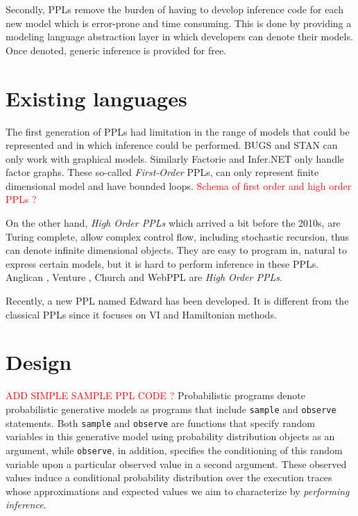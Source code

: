 Secondly, \gls{PPL}s remove the burden of having to develop inference code for each new model which is error-prone and time consuming.
This is done by providing a modeling language abstraction layer in which developers can denote their models.  Once denoted, generic inference is provided for free.

\section{Existing languages}
The first generation of \gls{PPL}s had limitation in the range of models that could be represented and in which inference could be performed.
BUGS \cite{Bugs} and STAN \cite{Stan} can only work with graphical models.
Similarly Factorie \cite{Factorie} and Infer.NET \cite{InferNET} only handle factor graphs.
These so-called \textit{First-Order} \gls{PPLs}, can only represent finite dimensional model and have bounded loops.
\textcolor{red}{Schema of first order and high order PPLs ?}

On the other hand, \textit{High Order \gls{PPLs}} which arrived a bit before the 2010s, are Turing complete, allow complex control flow, including stochastic recursion, thus can denote infinite dimensional objects.
They are easy to program in, natural to express certain models, but it is hard to perform inference in
these \gls{PPL}s. Anglican \cite{wood-aistats-2014}, Venture \cite{Mansinghka:2014ty}, Church \cite{Goodman:2012uq} and WebPPL \cite{dippl} are \textit{High Order \gls{PPLs}}.


Recently, a new \gls{PPL} named Edward \cite{Edward} has been developed. It is different from the classical \gls{PPL}s since it focuses on \gls{VI} and Hamiltonian methods.


\section{Design}
\textcolor{red}{ADD SIMPLE SAMPLE PPL CODE ?}
Probabilistic programs denote probabilistic generative models as programs that include \texttt{sample} and \texttt{observe} statements. Both \texttt{sample} and \texttt{observe} are functions that specify random variables in this generative model using probability distribution objects as an argument, while \texttt{observe}, in addition, specifies the conditioning of this random variable upon a particular observed value in a second argument. These observed values induce a conditional probability distribution over the execution traces whose approximations and expected values we aim to characterize by \textit{performing inference}.

